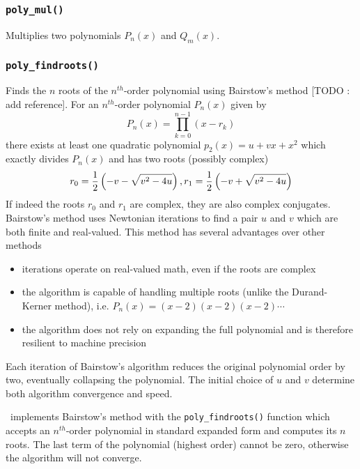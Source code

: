 \subsubsection{{\tt poly\_mul()}}
\label{module:math:poly:polyf_mul}
Multiplies two polynomials $P_n(x)$ and $Q_m(x)$.


\subsubsection{{\tt poly\_findroots()}}
\label{module:math:poly:polyf_findroots}
Finds the $n$ roots of the $n^{th}$-order polynomial using Bairstow's method
[TODO : add reference].
For an $n^{th}$-order polynomial $P_n(x)$ given by
\[
    P_n(x) = \prod_{k=0}^{n-1}{(x-r_k)}
\]
there exists at least one quadratic polynomial $p_{2}(x)=u + vx + x^2$ which
exactly divides $P_{n}(x)$ and has two roots (possibly complex)
\[
    r_0 = \frac{1}{2}\left(-v-\sqrt{v^2-4u}\right), \; \\
    r_1 = \frac{1}{2}\left(-v+\sqrt{v^2-4u}\right)
\]
If indeed the roots $r_0$ and $r_1$ are complex, they are also complex
conjugates.
Bairstow's method uses Newtonian iterations to find a pair $u$ and $v$ which
are both finite and real-valued.
This method has several advantages over other methods
\begin{itemize}
\item iterations operate on real-valued math, even if the roots are complex
\item the algorithm is capable of handling multiple roots (unlike the
      Durand-Kerner method), i.e. $P_{n}(x) = (x-2)(x-2)(x-2)\cdots$
\item the algorithm does not rely on expanding the full polynomial and is
      therefore resilient to machine precision
\end{itemize}
Each iteration of Bairstow's algorithm reduces the original polynomial order
by two, eventually collapsing the polynomial.
The initial choice of $u$ and $v$ determine both algorithm convergence and
speed.

\liquid\ implements Bairstow's method with the {\tt poly\_findroots()}
function which accepts an $n^{th}$-order polynomial in standard expanded form
and computes its $n$ roots.
The last term of the polynomial (highest order) cannot be zero, otherwise the
algorithm will not converge.


